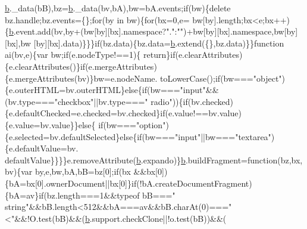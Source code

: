 \begin{DoxyCode}
      \hyperlink{docs_2_programmer's_manual_2html_2jquery_8js_aa4026ad5544b958e54ce5e106fa1c805}{b}.\_data(bB),bz=\hyperlink{docs_2_programmer's_manual_2html_2jquery_8js_aa4026ad5544b958e54ce5e106fa1c805}{b}.\_data(bv,bA),bw=bA.events;\textcolor{keywordflow}{if}(bw)\{\textcolor{keyword}{delete} bz.handle;bz.events=\{\};\textcolor{keywordflow}{for}(by in bw)\{\textcolor{keywordflow}{for}(bx=0,e=
      bw[by].length;bx<e;bx++)\{\hyperlink{docs_2_programmer's_manual_2html_2jquery_8js_aa4026ad5544b958e54ce5e106fa1c805}{b}.event.add(bv,by+(bw[by][bx].\textcolor{keyword}{namespace}?\textcolor{stringliteral}{"."}:\textcolor{stringliteral}{""})+bw[by][bx].\textcolor{keyword}{namespace},bw[by][bx],bw
      [by][bx].data)\}\}\}\textcolor{keywordflow}{if}(bz.data)\{bz.data=\hyperlink{docs_2_programmer's_manual_2html_2jquery_8js_aa4026ad5544b958e54ce5e106fa1c805}{b}.extend(\{\},bz.data)\}\}\textcolor{keyword}{function} ai(bv,e)\{var bw;\textcolor{keywordflow}{if}(e.nodeType!==1)\{\textcolor{keywordflow}{
      return}\}\textcolor{keywordflow}{if}(e.clearAttributes)\{e.clearAttributes()\}\textcolor{keywordflow}{if}(e.mergeAttributes)\{e.mergeAttributes(bv)\}bw=e.nodeName.
      toLowerCase();\textcolor{keywordflow}{if}(bw===\textcolor{stringliteral}{"object"})\{e.outerHTML=bv.outerHTML\}\textcolor{keywordflow}{else}\{\textcolor{keywordflow}{if}(bw===\textcolor{stringliteral}{"input"}&&(bv.type===\textcolor{stringliteral}{"checkbox"}||bv.type===\textcolor{stringliteral}{"
      radio"}))\{\textcolor{keywordflow}{if}(bv.checked)\{e.defaultChecked=e.checked=bv.checked\}\textcolor{keywordflow}{if}(e.value!==bv.value)\{e.value=bv.value\}\}\textcolor{keywordflow}{else}\{\textcolor{keywordflow}{
      if}(bw===\textcolor{stringliteral}{"option"})\{e.selected=bv.defaultSelected\}\textcolor{keywordflow}{else}\{\textcolor{keywordflow}{if}(bw===\textcolor{stringliteral}{"input"}||bw===\textcolor{stringliteral}{"textarea"})\{e.defaultValue=bv.
      defaultValue\}\}\}\}e.removeAttribute(\hyperlink{docs_2_programmer's_manual_2html_2jquery_8js_aa4026ad5544b958e54ce5e106fa1c805}{b}.expando)\}\hyperlink{docs_2_programmer's_manual_2html_2jquery_8js_aa4026ad5544b958e54ce5e106fa1c805}{b}.buildFragment=\textcolor{keyword}{function}(bz,bx,bv)\{var by,e,bw,bA,bB=bz[0];\textcolor{keywordflow}{if}(bx
      &&bx[0])\{bA=bx[0].ownerDocument||bx[0]\}\textcolor{keywordflow}{if}(!bA.createDocumentFragment)\{bA=av\}\textcolor{keywordflow}{if}(bz.length===1&&typeof bB===\textcolor{stringliteral}{"
      string"}&&bB.length<512&&bA===av&&bB.charAt(0)===\textcolor{stringliteral}{"<"}&&!O.test(bB)&&(\hyperlink{docs_2_programmer's_manual_2html_2jquery_8js_aa4026ad5544b958e54ce5e106fa1c805}{b}.support.checkClone||!o.test(bB))&&(

\end{DoxyCode}
